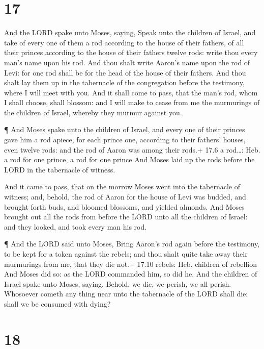 \hypertarget{section-16}{%
\section{17}\label{section-16}}

 And the LORD spake unto Moses, saying,  Speak
unto the children of Israel, and take of every one of them a rod
according to the house of their fathers, of all their princes according
to the house of their fathers twelve rods: write thou every man's name
upon his rod.  And thou shalt write Aaron's name upon the
rod of Levi: for one rod shall be for the head of the house of their
fathers.  And thou shalt lay them up in the tabernacle of
the congregation before the testimony, where I will meet with you.
 And it shall come to pass, that the man's rod, whom I shall
choose, shall blossom: and I will make to cease from me the murmurings
of the children of Israel, whereby they murmur against you.

 ¶ And Moses spake unto the children of Israel, and every
one of their princes gave him a rod apiece, for each prince one,
according to their fathers' houses, even twelve rods: and the rod of
Aaron was among their rods.+ 17.6 a rod\ldots: Heb. a rod for one
prince, a rod for one prince  And Moses laid up the rods
before the LORD in the tabernacle of witness.

 And it came to pass, that on the morrow Moses went into the
tabernacle of witness; and, behold, the rod of Aaron for the house of
Levi was budded, and brought forth buds, and bloomed blossoms, and
yielded almonds.  And Moses brought out all the rods from
before the LORD unto all the children of Israel: and they looked, and
took every man his rod.

 ¶ And the LORD said unto Moses, Bring Aaron's rod again
before the testimony, to be kept for a token against the rebels; and
thou shalt quite take away their murmurings from me, that they die not.+
17.10 rebels: Heb. children of rebellion  And Moses did so:
as the LORD commanded him, so did he.  And the children of
Israel spake unto Moses, saying, Behold, we die, we perish, we all
perish.  Whosoever cometh any thing near unto the
tabernacle of the LORD shall die: shall we be consumed with dying?

\hypertarget{section-17}{%
\section{18}\label{section-17}}

